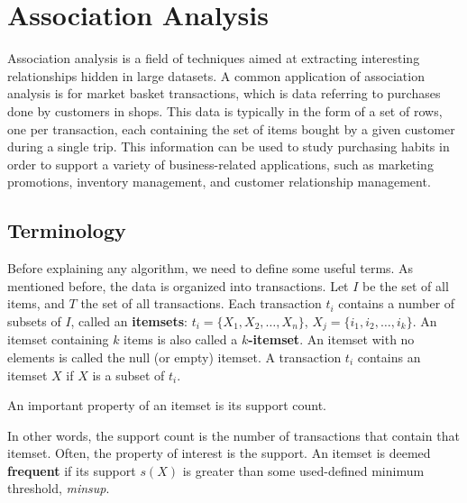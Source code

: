 \chapter{Association Analysis}

Association analysis is a field of techniques aimed at extracting interesting relationships hidden in large datasets. A common application of association analysis is for market basket transactions, which is data referring to purchases done by customers in shops. This data is typically in the form of a set of rows, one per transaction, each containing the set of items bought by a given customer during a single trip. This information can be used to study purchasing habits in order to support a variety of business-related applications, such as marketing promotions, inventory management, and customer relationship management.

\section{Terminology}

Before explaining any algorithm, we need to define some useful terms. As mentioned before, the data is organized into transactions. Let $I$ be the set of all items, and $T$ the set of all transactions. Each transaction $t_i$ contains a number of subsets of $I$, called an \textbf{itemsets}: $t_i = \{ X_1, X_2, \dots, X_n \}$, $X_j = \{ i_1, i_2, \dots, i_k \}$. An itemset containing $k$ items is also called a \textbf{$k$-itemset}. An itemset with no elements is called the null (or empty) itemset. A transaction $t_i$ contains an itemset $X$ if $X$ is a subset of $t_i$.

An important property of an itemset is its support count.

In other words, the support count is the number of transactions that contain that itemset. Often, the property of interest is the support.
An itemset is deemed \textbf{frequent} if its support $s(X)$ is greater than some used-defined minimum threshold, \textit{minsup}.

